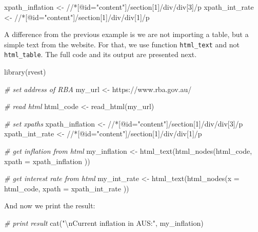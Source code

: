 \documentclass[
  12pt,
]{book}
\newenvironment{Shaded}{\begin{snugshade}}{\end{snugshade}}
\newcommand{\AttributeTok}[1]{\textcolor[rgb]{0.61,0.61,0.61}{#1}}
\newcommand{\CommentTok}[1]{\textcolor[rgb]{0.37,0.37,0.37}{\textit{#1}}}
\newcommand{\FunctionTok}[1]{\textcolor[rgb]{0,0,0}{#1}}
\newcommand{\NormalTok}[1]{#1}
\newcommand{\OtherTok}[1]{\textcolor[rgb]{0.37,0.37,0.37}{#1}}
\newcommand{\SpecialCharTok}[1]{\textcolor[rgb]{0,0,0}{#1}}
\newcommand{\StringTok}[1]{\textcolor[rgb]{0.5,0.5,0.5}{#1}}
\begin{document}
\begin{Shaded}
\begin{Highlighting}[]
\NormalTok{xpath\_inflation }\OtherTok{\textless{}{-}} \StringTok{\textquotesingle{}//*[@id="content"]/section[1]/div/div[3]/p\textquotesingle{}}
\NormalTok{xpath\_int\_rate }\OtherTok{\textless{}{-}} \StringTok{\textquotesingle{}//*[@id="content"]/section[1]/div/div[1]/p\textquotesingle{}}
\end{Highlighting}
\end{Shaded}

A difference from the previous example is we are not importing a table, but a simple text from the website. For that, we use function \texttt{html\_text} and not \texttt{html\_table}. The full code and its output are presented next.

\begin{Shaded}
\begin{Highlighting}[]
\FunctionTok{library}\NormalTok{(rvest)}

\CommentTok{\# set address of RBA}
\NormalTok{my\_url }\OtherTok{\textless{}{-}} \StringTok{\textquotesingle{}https://www.rba.gov.au/\textquotesingle{}}

\CommentTok{\# read html}
\NormalTok{html\_code }\OtherTok{\textless{}{-}} \FunctionTok{read\_html}\NormalTok{(my\_url)}

\CommentTok{\# set xpaths}
\NormalTok{xpath\_inflation }\OtherTok{\textless{}{-}} \StringTok{\textquotesingle{}//*[@id="content"]/section[1]/div/div[3]/p\textquotesingle{}}
\NormalTok{xpath\_int\_rate }\OtherTok{\textless{}{-}} \StringTok{\textquotesingle{}//*[@id="content"]/section[1]/div/div[1]/p\textquotesingle{}}

\CommentTok{\# get inflation from html}
\NormalTok{my\_inflation }\OtherTok{\textless{}{-}} \FunctionTok{html\_text}\NormalTok{(}\FunctionTok{html\_nodes}\NormalTok{(html\_code,}
                                     \AttributeTok{xpath =}\NormalTok{ xpath\_inflation ))}

\CommentTok{\# get interest rate from html}
\NormalTok{my\_int\_rate }\OtherTok{\textless{}{-}} \FunctionTok{html\_text}\NormalTok{(}\FunctionTok{html\_nodes}\NormalTok{(}\AttributeTok{x =}\NormalTok{ html\_code,}
                                    \AttributeTok{xpath =}\NormalTok{ xpath\_int\_rate ))}
\end{Highlighting}
\end{Shaded}

And now we print the result:

\begin{Shaded}
\begin{Highlighting}[]
\CommentTok{\# print result}
\FunctionTok{cat}\NormalTok{(}\StringTok{"}\SpecialCharTok{\textbackslash{}n}\StringTok{Current inflation in AUS:"}\NormalTok{, my\_inflation)}
\end{Highlighting}
\end{Shaded}
\end{document}
